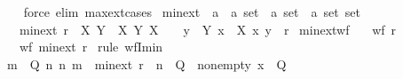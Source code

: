 \begin{isabellebody}
%
\isadelimproof
\ \ %
\endisadelimproof
%
\isatagproof
{}\isamarkupfalse%
\ {\isacharparenleft}{\kern0pt}force\ elim{\isacharbang}{\kern0pt}{\isacharcolon}{\kern0pt}\ max{\isacharunderscore}{\kern0pt}ext{\isachardot}{\kern0pt}cases{\isacharparenright}{\kern0pt}%
\endisatagproof
{\isafoldproof}%
%
\isadelimproof
\isanewline
%
\endisadelimproof
\isanewline
{}\isamarkupfalse%
\ min{\isacharunderscore}{\kern0pt}ext\ {\isacharcolon}{\kern0pt}{\isacharcolon}{\kern0pt}\ {\isachardoublequoteopen}{\isacharparenleft}{\kern0pt}{\isacharprime}{\kern0pt}a\ {\isasymtimes}\ {\isacharprime}{\kern0pt}a{\isacharparenright}{\kern0pt}\ set\ {\isasymRightarrow}\ {\isacharparenleft}{\kern0pt}{\isacharprime}{\kern0pt}a\ set\ {\isasymtimes}\ {\isacharprime}{\kern0pt}a\ set{\isacharparenright}{\kern0pt}\ set{\isachardoublequoteclose}\isanewline
\ \ \ {\isachardoublequoteopen}min{\isacharunderscore}{\kern0pt}ext\ r\ {\isacharequal}{\kern0pt}\ {\isacharbraceleft}{\kern0pt}{\isacharparenleft}{\kern0pt}X{\isacharcomma}{\kern0pt}\ Y{\isacharparenright}{\kern0pt}\ {\isacharbar}{\kern0pt}\ X\ Y{\isachardot}{\kern0pt}\ X\ {\isasymnoteq}\ {\isacharbraceleft}{\kern0pt}{\isacharbraceright}{\kern0pt}\ {\isasymand}\ {\isacharparenleft}{\kern0pt}{\isasymforall}y\ {\isasymin}\ Y{\isachardot}{\kern0pt}\ {\isacharparenleft}{\kern0pt}{\isasymexists}x\ {\isasymin}\ X{\isachardot}{\kern0pt}\ {\isacharparenleft}{\kern0pt}x{\isacharcomma}{\kern0pt}\ y{\isacharparenright}{\kern0pt}\ {\isasymin}\ r{\isacharparenright}{\kern0pt}{\isacharparenright}{\kern0pt}{\isacharbraceright}{\kern0pt}{\isachardoublequoteclose}\isanewline
\isanewline
{}\isamarkupfalse%
\ min{\isacharunderscore}{\kern0pt}ext{\isacharunderscore}{\kern0pt}wf{\isacharcolon}{\kern0pt}\isanewline
\ \ \ {\isachardoublequoteopen}wf\ r{\isachardoublequoteclose}\isanewline
\ \ \ {\isachardoublequoteopen}wf\ {\isacharparenleft}{\kern0pt}min{\isacharunderscore}{\kern0pt}ext\ r{\isacharparenright}{\kern0pt}{\isachardoublequoteclose}\isanewline
%
\isadelimproof
%
\endisadelimproof
%
\isatagproof
{}\isamarkupfalse%
\ {\isacharparenleft}{\kern0pt}rule\ wfI{\isacharunderscore}{\kern0pt}min{\isacharparenright}{\kern0pt}\isanewline
\ \ \isamarkupfalse%
\ {\isachardoublequoteopen}{\isasymexists}m\ {\isasymin}\ Q{\isachardot}{\kern0pt}\ {\isacharparenleft}{\kern0pt}{\isasymforall}n{\isachardot}{\kern0pt}\ {\isacharparenleft}{\kern0pt}n{\isacharcomma}{\kern0pt}\ m{\isacharparenright}{\kern0pt}\ {\isasymin}\ min{\isacharunderscore}{\kern0pt}ext\ r\ {\isasymlongrightarrow}\ n\ {\isasymnotin}\ Q{\isacharparenright}{\kern0pt}{\isachardoublequoteclose}\ \ nonempty{\isacharcolon}{\kern0pt}\ {\isachardoublequoteopen}x\ {\isasymin}\ Q{\isachardoublequoteclose}\isanewline

\end{isabellebody}
